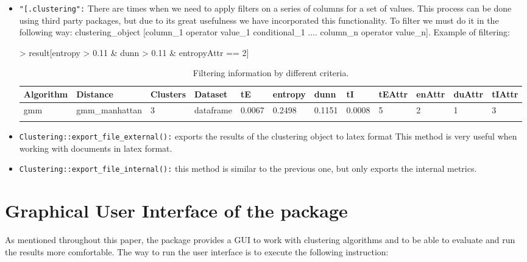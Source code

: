 \begin{itemize}
  \item \texttt{"[.clustering":} There are times when we need to apply filters on a series of columns for a set of values. This process can be done using third party packages, but due to its great usefulness we have incorporated this functionality. To filter we must do it in the following way: clustering\_object [column\_1 operator value\_1 conditional\_1 .... column\_n operator value\_n]. Example of filtering:
  \begin{Schunk}
\begin{Sinput}
> result[entropy > 0.11 & dunn > 0.11 & entropyAttr == 2]
\end{Sinput}
\end{Schunk}
{\small
\begin{longtable}{| p{1cm} | p{1.8cm} | p{0.7cm} | p{0.9cm} | p{0.5cm} | p{0.65cm} | p{0.5cm} | p{0.5cm} | p{0.55cm} | p{0.55cm} | p{0.6cm} | p{0.5cm} |}
\hline
\scriptsize  Algorithm & \scriptsize  Distance  &  \scriptsize Clusters & \scriptsize  Dataset & \scriptsize tE & \scriptsize entropy & \scriptsize  dunn  & \scriptsize tI & \scriptsize tEAttr & \scriptsize enAttr & \scriptsize duAttr & \scriptsize tIAttr  \\
\hline
\scriptsize    gmm     & \scriptsize  gmm\_manhattan & \scriptsize      3  & \scriptsize   dataframe  & \scriptsize   0.0067  & \scriptsize  0.2498  & \scriptsize 0.1151  & \scriptsize    0.0008     & \scriptsize     5       & \scriptsize       2    & \scriptsize      1      & \scriptsize      3 \\
\hline
\caption{Filtering information by different criteria.}
\label{tab:filtering}
\end{longtable}}

  \item \texttt{Clustering::export\_file\_external():} exports the results of the clustering object to latex format This method is very useful when working with documents in latex format.
  \item \texttt{Clustering::export\_file\_internal():} this method is similar to the previous one, but only exports the internal metrics.
\end{itemize}


\section{Graphical User Interface of the  package}

As mentioned throughout this paper, the  package provides a GUI to work with clustering algorithms and to be able to evaluate and run the results more comfortable. The way to run the user interface is to execute the following instruction:

